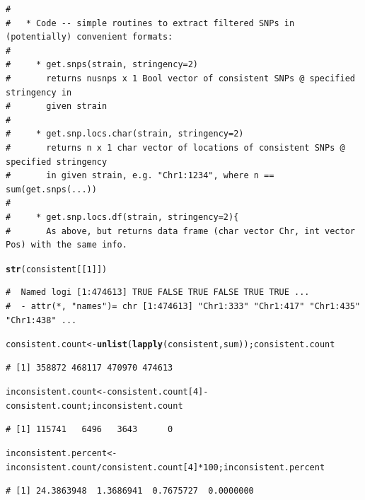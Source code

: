 \documentclass{article}\usepackage[]{graphicx}\usepackage[]{color}
\makeatletter
\newcommand{\hlnum}[1]{\textcolor[rgb]{0.686,0.059,0.569}{#1}}%
\newcommand{\hlopt}[1]{\textcolor[rgb]{0,0,0}{#1}}%
\newcommand{\hlstd}[1]{\textcolor[rgb]{0.345,0.345,0.345}{#1}}%
\newcommand{\hlkwb}[1]{\textcolor[rgb]{0.69,0.353,0.396}{#1}}%
\newcommand{\hlkwd}[1]{\textcolor[rgb]{0.737,0.353,0.396}{\textbf{#1}}}%
\newenvironment{kframe}{%
 \def\at@end@of@kframe{}%
 \ifinner\ifhmode%
  \def\at@end@of@kframe{\end{minipage}}%
  \begin{minipage}{\columnwidth}%
 \fi\fi%
 \def\FrameCommand##1{\hskip\@totalleftmargin \hskip-\fboxsep
 \colorbox{shadecolor}{##1}\hskip-\fboxsep
     \hskip-\linewidth \hskip-\@totalleftmargin \hskip\columnwidth}%
 \MakeFramed {\advance\hsize-\width
   \@totalleftmargin\z@ \linewidth\hsize
   \@setminipage}}%
 {\par\unskip\endMakeFramed%
 \at@end@of@kframe}
\newenvironment{knitrout}{}{} %
\makeatother
\begin{document}
\begin{knitrout}
\begin{kframe}
\begin{verbatim}
# 
#   * Code -- simple routines to extract filtered SNPs in (potentially) convenient formats:
# 
#     * get.snps(strain, stringency=2)
#       returns nusnps x 1 Bool vector of consistent SNPs @ specified stringency in
#       given strain
# 
#     * get.snp.locs.char(strain, stringency=2)
#       returns n x 1 char vector of locations of consistent SNPs @ specified stringency
#       in given strain, e.g. "Chr1:1234", where n == sum(get.snps(...))
# 
#     * get.snp.locs.df(strain, stringency=2){
#       As above, but returns data frame (char vector Chr, int vector Pos) with the same info.
\end{verbatim}
\end{kframe}
\end{knitrout}
\begin{knitrout}\tiny
{}\color{fgcolor}\begin{kframe}
\begin{alltt}
\hlkwd{str}\hlstd{(consistent[[}\hlnum{1}\hlstd{]])}
\end{alltt}
\begin{verbatim}
#  Named logi [1:474613] TRUE FALSE TRUE FALSE TRUE TRUE ...
#  - attr(*, "names")= chr [1:474613] "Chr1:333" "Chr1:417" "Chr1:435" "Chr1:438" ...
\end{verbatim}
\end{kframe}
\end{knitrout}
\begin{knitrout}\footnotesize
{}\color{fgcolor}\begin{kframe}
\begin{alltt}
\hlstd{consistent.count} \hlkwb{<-} \hlkwd{unlist}\hlstd{(}\hlkwd{lapply}\hlstd{(consistent, sum)) ; consistent.count}
\end{alltt}
\begin{verbatim}
# [1] 358872 468117 470970 474613
\end{verbatim}
\begin{alltt}
\hlstd{inconsistent.count} \hlkwb{<-} \hlstd{consistent.count[}\hlnum{4}\hlstd{]} \hlopt{-} \hlstd{consistent.count; inconsistent.count}
\end{alltt}
\begin{verbatim}
# [1] 115741   6496   3643      0
\end{verbatim}
\begin{alltt}
\hlstd{inconsistent.percent} \hlkwb{<-} \hlstd{inconsistent.count}\hlopt{/}\hlstd{consistent.count[}\hlnum{4}\hlstd{]}\hlopt{*}\hlnum{100}\hlstd{; inconsistent.percent}
\end{alltt}
\begin{verbatim}
# [1] 24.3863948  1.3686941  0.7675727  0.0000000
\end{verbatim}
\end{kframe}
\end{knitrout}
\end{document}
